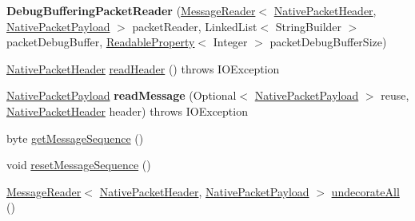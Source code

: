 \begin{DoxyCompactItemize}
\item 
\mbox{\label{classcom_1_1mysql_1_1cj_1_1protocol_1_1a_1_1_debug_buffering_packet_reader_a9060c97fdff3924c3e5bd97bbea114c7}} 
{\bfseries Debug\+Buffering\+Packet\+Reader} (\mbox{\hyperlink{interfacecom_1_1mysql_1_1cj_1_1protocol_1_1_message_reader}{Message\+Reader}}$<$ \mbox{\hyperlink{classcom_1_1mysql_1_1cj_1_1protocol_1_1a_1_1_native_packet_header}{Native\+Packet\+Header}}, \mbox{\hyperlink{classcom_1_1mysql_1_1cj_1_1protocol_1_1a_1_1_native_packet_payload}{Native\+Packet\+Payload}} $>$ packet\+Reader, Linked\+List$<$ String\+Builder $>$ packet\+Debug\+Buffer, \mbox{\hyperlink{interfacecom_1_1mysql_1_1cj_1_1conf_1_1_readable_property}{Readable\+Property}}$<$ Integer $>$ packet\+Debug\+Buffer\+Size)
\item 
\mbox{\hyperlink{classcom_1_1mysql_1_1cj_1_1protocol_1_1a_1_1_native_packet_header}{Native\+Packet\+Header}} \mbox{\hyperlink{classcom_1_1mysql_1_1cj_1_1protocol_1_1a_1_1_debug_buffering_packet_reader_a59ead81a6bb0f0b358f9e44db6b63280}{read\+Header}} ()  throws I\+O\+Exception 
\item 
\mbox{\label{classcom_1_1mysql_1_1cj_1_1protocol_1_1a_1_1_debug_buffering_packet_reader_a50c66cbcfdd3b08a8135f3b6eb91cd19}} 
\mbox{\hyperlink{classcom_1_1mysql_1_1cj_1_1protocol_1_1a_1_1_native_packet_payload}{Native\+Packet\+Payload}} {\bfseries read\+Message} (Optional$<$ \mbox{\hyperlink{classcom_1_1mysql_1_1cj_1_1protocol_1_1a_1_1_native_packet_payload}{Native\+Packet\+Payload}} $>$ reuse, \mbox{\hyperlink{classcom_1_1mysql_1_1cj_1_1protocol_1_1a_1_1_native_packet_header}{Native\+Packet\+Header}} header)  throws I\+O\+Exception 
\item 
byte \mbox{\hyperlink{classcom_1_1mysql_1_1cj_1_1protocol_1_1a_1_1_debug_buffering_packet_reader_a221efd81777e2a3fcceb0368f6baf0db}{get\+Message\+Sequence}} ()
\item 
void \mbox{\hyperlink{classcom_1_1mysql_1_1cj_1_1protocol_1_1a_1_1_debug_buffering_packet_reader_a6739a6433fdce69bb684e15048481dc2}{reset\+Message\+Sequence}} ()
\item 
\mbox{\hyperlink{interfacecom_1_1mysql_1_1cj_1_1protocol_1_1_message_reader}{Message\+Reader}}$<$ \mbox{\hyperlink{classcom_1_1mysql_1_1cj_1_1protocol_1_1a_1_1_native_packet_header}{Native\+Packet\+Header}}, \mbox{\hyperlink{classcom_1_1mysql_1_1cj_1_1protocol_1_1a_1_1_native_packet_payload}{Native\+Packet\+Payload}} $>$ \mbox{\hyperlink{classcom_1_1mysql_1_1cj_1_1protocol_1_1a_1_1_debug_buffering_packet_reader_ae6337b7785d1c8adb1b4784387c2f959}{undecorate\+All}} ()

\end{DoxyCompactItemize}
